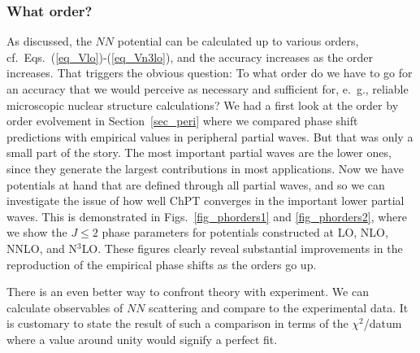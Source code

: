 \documentclass[sort&compress,preprint,3p]{elsarticle}
\begin{document}
\subsubsection{What order?}

As discussed, the $NN$ potential can be calculated up to
various orders, cf.\ Eqs.~(\ref{eq_Vlo})-(\ref{eq_Vn3lo}),
and the accuracy increases as the order increases.
That triggers the obvious question:
To what order do we have to go for an accuracy that
we would perceive as necessary and sufficient
for, e.~g., reliable microscopic nuclear structure
calculations?
We had a first look at the order by order 
evolvement in Section~\ref{sec_peri}
where we compared phase shift predictions with empirical values
in peripheral partial waves. But that was only a small part
of the story. 
The most important partial waves are the lower ones,
since they generate the largest contributions
in most applications.
Now we have potentials at hand that
are defined through all partial waves, and so we can
investigate the issue of how well ChPT converges in the
important lower partial waves. 
This is demonstrated in Figs.~\ref{fig_phorders1} and \ref{fig_phorders2},
where we show the $J\leq 2$ phase parameters for potentials constructed
at LO, NLO, NNLO, and N$^3$LO. These figures clearly reveal
substantial improvements in the reproduction of the empirical
phase shifts as the orders go up.

There is an even better way to confront theory with
experiment.
We can calculate observables of
$NN$ scattering and compare to the experimental data.
It is customary to state the result of such a comparison
in terms of the $\chi^2$/datum where a value around unity
would signify a perfect fit.
\end{document}
